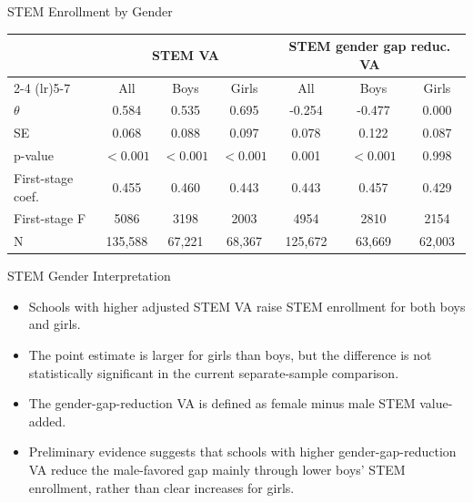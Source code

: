 \documentclass[notes,11pt,aspectratio=169]{beamer}
\newenvironment{wideitemize}{%
  \begin{minipage}{0.90\textwidth}
  \begin{itemize}
  \addtolength{\itemsep}{1em}
}{%
  \end{itemize}
  \end{minipage}
}
\begin{document}
\begin{frame}{STEM Enrollment by Gender}
\centering
\scriptsize
\begin{tabular}{lcccccc}
\toprule
 & \multicolumn{3}{c}{STEM VA} & \multicolumn{3}{c}{STEM gender gap reduc. VA} \\
\cmidrule(lr){2-4} \cmidrule(lr){5-7}
 & All & Boys & Girls & All & Boys & Girls \\
\midrule
\(\theta\) & 0.584 & 0.535 & 0.695 & -0.254 & -0.477 & 0.000 \\
SE & 0.068 & 0.088 & 0.097 & 0.078 & 0.122 & 0.087 \\
p-value & \(<0.001\) & \(<0.001\) & \(<0.001\) & 0.001 & \(<0.001\) & 0.998 \\
\midrule
First-stage coef. & 0.455 & 0.460 & 0.443 & 0.443 & 0.457 & 0.429 \\
First-stage F & 5086 & 3198 & 2003 & 4954 & 2810 & 2154 \\
N & 135,588 & 67,221 & 68,367 & 125,672 & 63,669 & 62,003 \\
\bottomrule
\end{tabular}
\end{frame}

\begin{frame}{STEM Gender Interpretation}
\begin{wideitemize}
  \item Schools with higher adjusted STEM VA raise STEM enrollment for both boys and girls.

  \item The point estimate is larger for girls than boys, but the difference is not statistically significant in the current separate-sample comparison.

  \item The gender-gap-reduction VA is defined as female minus male STEM value-added.

  \item Preliminary evidence suggests that schools with higher gender-gap-reduction VA reduce the male-favored gap mainly through lower boys' STEM enrollment, rather than clear increases for girls.
\end{wideitemize}
\end{frame}
\end{document}
